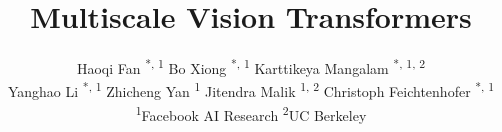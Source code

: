 \documentclass[10pt,twocolumn,letterpaper]{article}
\begin{document}
	
	\title{ 
	\vspace{-.5em} Multiscale Vision Transformers  \\ \vspace{-.7em}
	}
\author{
	Haoqi Fan\textsuperscript{ *, 1} \qquad
	Bo Xiong\textsuperscript{ *, 1} \qquad
	Karttikeya Mangalam\textsuperscript{ *, 1, 2}  \vspace{.1em} \\
	Yanghao Li\textsuperscript{ *, 1}   \qquad
	Zhicheng Yan\textsuperscript{ 1} \qquad \quad
	Jitendra Malik\textsuperscript{ 1, 2} \qquad \quad
	Christoph Feichtenhofer\textsuperscript{ *, 1}  \vspace{.8em}\\
	\textsuperscript{1}Facebook AI Research \qquad \qquad \textsuperscript{2}UC Berkeley 
	 \vspace{-.8em}
}
\maketitle
\ificcvfinal
    \renewcommand*{\thefootnote}{\fnsymbol{footnote}}
    \setcounter{footnote}{1}
    \renewcommand*{\thefootnote}{\arabic{footnote}}
    \setcounter{footnote}{0}
\fi

	
\newcommand{\fastcolor}[1]{\textcolor{fastcolor}{#1}}
\newcommand{\fastcolorC}[1]{\textcolor{orange}{#1}}
\newcommand{\slowcolor}[1]{\textcolor{slowcolor}{#1}}
\newcommand{\expandcolor}[1]{\textcolor{expandcolor}{#1}}
\newcommand{\clipscolor}[1]{\textcolor{clipscolor}{#1}}

\newcommand{\slow}{\slowcolor{Slow }}
\newcommand{\fast}{\fastcolor{Fast }}

\newcommand{\predictioncolor}[1]{\textcolor{predictioncolor}{#1}}
\newcommand{\labelcolor}[1]{\textcolor{labelcolor}{#1}}

\newcommand{\pred}{\predictioncolor{\textbf{Predictions}: }}
\newcommand{\gt}{\labelcolor{\textbf{Labels}: }}


\newcommand{\demph}[1]{\textcolor{demphcolor}{#1}}

\newcommand{\xycolor}[1]{\textcolor{xycolor}{#1}}
\newcommand{\wcolor}[1]{\textcolor{wcolor}{#1}}
\newcommand{\dcolor}[1]{\textcolor{dcolor}{#1}}
\newcommand{\gcolor}[1]{\textcolor{gcolor}{#1}}
\newcommand{\tcolor}[1]{\textcolor{citecolor}{#1}}
\newcommand{\eicolor}[1]{\textcolor{eicolor}{#1}}
\end{document}
